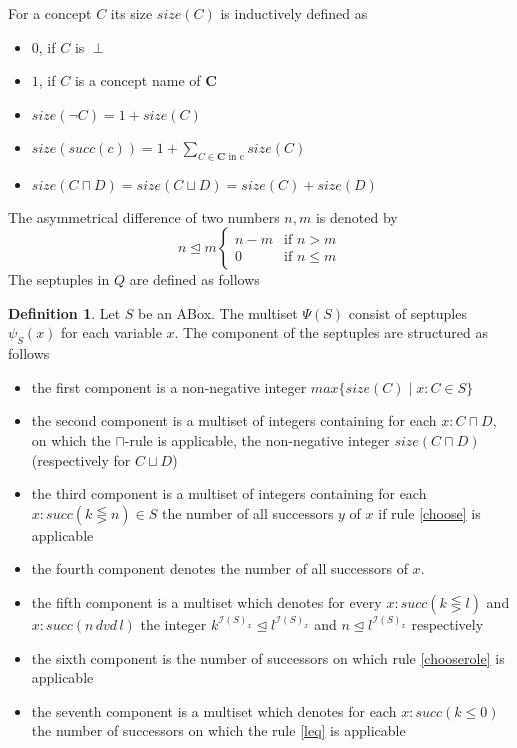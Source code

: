 \documentclass[a4paper,11pt]{scrartcl}
\theoremstyle{break}
\theoremstyle{definition}
\newtheorem{mydef}{Definition}
\begin{document}
For a concept $C$ its size $size(C)$ is inductively defined as
\begin{itemize}
\item $0$, if $C$ is $\perp$
\item $1$, if $C$ is a concept name of $\mathbf{C}$
\item $size(\neg C)= 1+size(C)$
\item $size(succ(c))= 1 + \sum_{C\in\mathbf{C}\text{ in c}} size(C)$
\item $size(C\sqcap D)=size(C\sqcup D)=size(C)+size(D)$
\end{itemize}
The asymmetrical difference of two numbers $n,m$ is denoted by 
\begin{equation*}
n\unlhd m \begin{cases}
n-m& \text{if } n> m\\
0 & \text{if } n\leq m
\end{cases}
\end{equation*}
The septuples in $Q$ are defined as follows
\begin{mydef}
Let $S$ be an ABox. The multiset $\Psi(S)$ consist of septuples $\psi_S(x)$ for each variable $x$. The component of the septuples are structured as follows
\begin{itemize}
\item the first component is a non-negative integer $max\{size(C)\mid x:C\in S\}$
\item the second component is a multiset of integers containing for each $x:C\sqcap D$, on which the $\sqcap$-rule is applicable, the non-negative integer $size(C\sqcap D)$ (respectively for $C\sqcup D$)
\item the third component is a multiset of integers containing for each $x:succ(k\lesseqgtr n)\in S$ the number of all successors $y$ of $x$ if rule \ref{choose} is applicable
\item the fourth component denotes the number of all successors of $x$.
\item the fifth component is a multiset which denotes for every $x:succ(k\lesseqgtr l)$ and $x:succ(n\,dvd\,l)$ the integer $k^{\mathcal{I}(S)_x}\unlhd l^{\mathcal{I}(S)_x}$ and $n\unlhd l^{\mathcal{I}(S)_x}$ respectively
\item the sixth component is the number of successors on which rule \ref{chooserole} is applicable
\item the seventh component is a multiset which denotes for each $x:succ(k\leq 0)$ the number of successors on which the rule \ref{leq} is applicable
\end{itemize}
\end{mydef}
\end{document}
